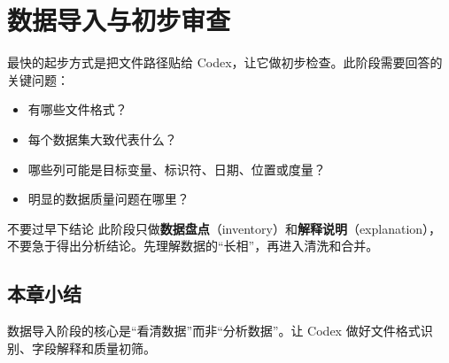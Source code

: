 \section{数据导入与初步审查}

最快的起步方式是把文件路径贴给 Codex，让它做初步检查。此阶段需要回答的关键问题：

\begin{itemize}[nosep]
    \item 有哪些文件格式？
    \item 每个数据集大致代表什么？
    \item 哪些列可能是目标变量、标识符、日期、位置或度量？
    \item 明显的数据质量问题在哪里？
\end{itemize}

\begin{warningbox}{不要过早下结论}
此阶段只做\textbf{数据盘点}（inventory）和\textbf{解释说明}（explanation），不要急于得出分析结论。先理解数据的``长相''，再进入清洗和合并。
\end{warningbox}

\subsection{本章小结}
数据导入阶段的核心是``看清数据''而非``分析数据''。让 Codex 做好文件格式识别、字段解释和质量初筛。


